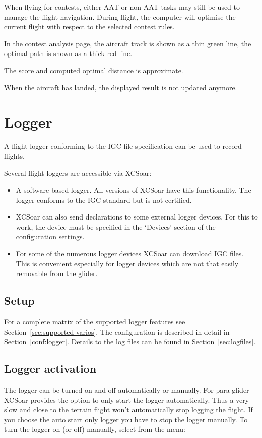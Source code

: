 When flying for contests, either AAT or non-AAT tasks may still be used to
manage the flight navigation.  During flight, the computer will optimise the
current flight with respect to the selected contest rules.  

In the contest analysis page, the aircraft track is shown as a thin green line, the optimal 
path is shown as a thick red line.

The score and computed optimal distance is approximate.

When the aircraft has landed, the displayed result is not updated anymore.


\section{Logger}\label{sec:logger}

A flight logger conforming to the IGC file specification can be used
to record flights.  

Several flight loggers are accessible via XCSoar:
\begin{itemize}
\item A software-based logger.  All versions of XCSoar have this
  functionality.  The logger conforms to the IGC standard but is not
  certified.
\item XCSoar can also send declarations to some external logger devices. 
  For this to work, the device must be specified in the `Devices' 
  section of the configuration  settings.
\item  For some of the numerous logger devices XCSoar can download IGC files. 
  This is convenient especially for logger devices which are not that easily
  removable from the glider.
\end{itemize}

\subsection*{Setup}
For a complete matrix of the supported logger features see Section~\ref{sec:supported-varios}.
The configuration is described in detail in Section~\ref{conf:logger}.  Details
to the log files can be found in Section~\ref{sec:logfiles}.

\subsection*{Logger activation}
The logger can be turned on and off automatically or manually.  For para-glider 
XCSoar provides the option to only start the logger automatically. Thus a very 
slow and close to the terrain flight won't automatically stop logging the flight. 
If you choose the auto start only logger you have to stop the logger manually.
To turn the logger on (or off) manually, select from the menu:
\begin{quote}
\blink{}
\end{quote}

